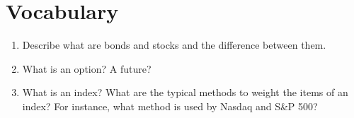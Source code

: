 \section{Vocabulary}

\begin{enumerate}
    \item Describe what are bonds and stocks and the difference between them.
    \item What is an option? A future?
    \item What is an index? What are the typical methods to weight the items of an index? For instance, what method is used by Nasdaq and S\&P 500?
\end{enumerate}
